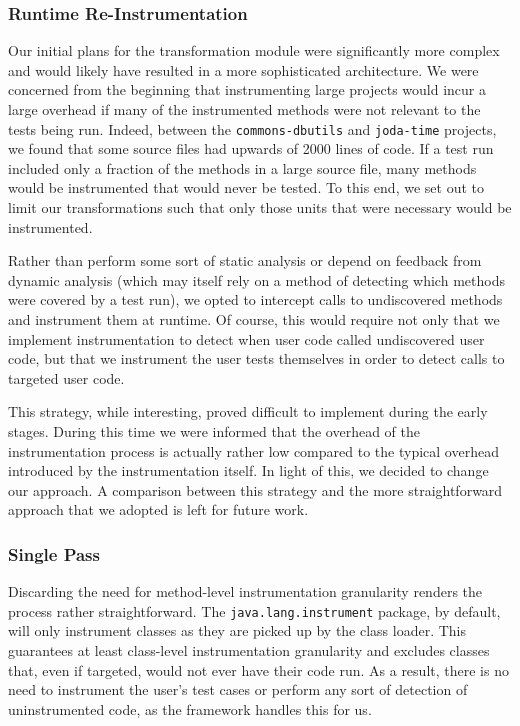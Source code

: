 \subsubsection{Runtime Re-Instrumentation}

Our initial plans for the transformation module were significantly more complex and would likely have resulted in a more sophisticated architecture. We were concerned from the beginning that instrumenting large projects would incur a large overhead if many of the instrumented methods were not relevant to the tests being run. Indeed, between the \texttt{commons-dbutils} and \texttt{joda-time} projects, we found that some source files had upwards of 2000 lines of code. If a test run included only a fraction of the methods in a large source file, many methods would be instrumented that would never be tested. To this end, we set out to limit our transformations such that only those units that were necessary would be instrumented.

Rather than perform some sort of static analysis or depend on feedback from dynamic analysis (which may itself rely on a method of detecting which methods were covered by a test run), we opted to intercept calls to undiscovered methods and instrument them at runtime. Of course, this would require not only that we implement instrumentation to detect when user code called undiscovered user code, but that we instrument the user tests themselves in order to detect calls to targeted user code.

This strategy, while interesting, proved difficult to implement during the early stages. During this time we were informed that the overhead of the instrumentation process is actually rather low compared to the typical overhead introduced by the instrumentation itself. In light of this, we decided to change our approach. A comparison between this strategy and the more straightforward approach that we adopted is left for future work.

\subsubsection{Single Pass}

Discarding the need for method-level instrumentation granularity renders the process rather straightforward. The \texttt{java.lang.instrument} package, by default, will only instrument classes as they are picked up by the class loader. This guarantees at least class-level instrumentation granularity and excludes classes that, even if targeted, would not ever have their code run. As a result, there is no need to instrument the user's test cases or perform any sort of detection of uninstrumented code, as the framework handles this for us.

